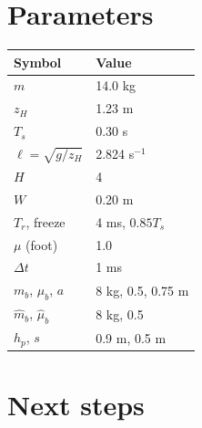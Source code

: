 \documentclass[11pt]{article}
\theoremstyle{remark}
\theoremstyle{definition}
\begin{document}
\section{Parameters}
\begin{center}
\begin{tabular}{ll}
\toprule
Symbol & Value\\
\midrule
$m$ & 14.0 kg\\
$z_H$ & 1.23 m\\
$T_s$ & 0.30 s\\
$\ell=\sqrt{g/z_H}$ & 2.824 s$^{-1}$\\
$H$ & 4\\
$W$ & 0.20 m\\
$T_r$, freeze & 4 ms, $0.85T_s$\\
$\mu$ (foot) & 1.0\\
$\Delta t$ & 1 ms\\
$m_b$, $\mu_b$, $a$ & 8 kg, 0.5, 0.75 m\\
$\hat m_b$, $\hat\mu_b$ & 8 kg, 0.5\\
$h_p$, $s$ & 0.9 m, 0.5 m\\
\bottomrule
\end{tabular}
\end{center}

\section{Next steps}\label{sec:nextsteps}
\end{document}
